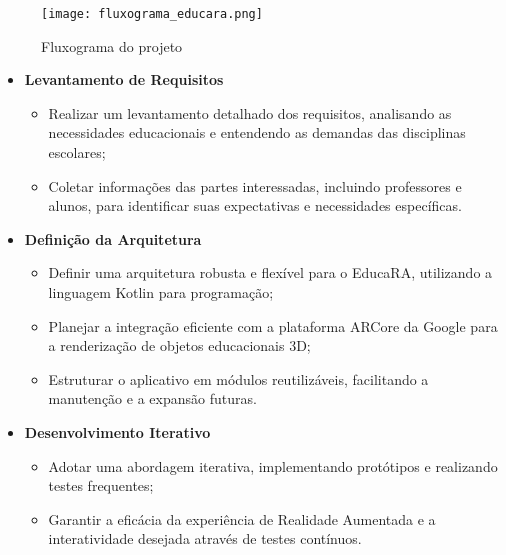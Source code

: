 \documentclass[12pt]{article}
\begin{document}
\begin{figure}[!htb]
  \centering
  \texttt{[image: fluxograma\_educara.png]}
  \caption{Fluxograma do projeto}
  \label{fig:fluxograma_educara}
\end{figure}

\begin{itemize} 
\item \textbf{Levantamento de Requisitos} 

\begin{itemize}
    \item Realizar um levantamento detalhado dos requisitos, analisando as necessidades educacionais e entendendo as demandas das disciplinas escolares;
    \item Coletar informações das partes interessadas, incluindo professores e alunos, para identificar suas expectativas e necessidades específicas.
\end{itemize}
\end{itemize}

\begin{itemize}
\item \textbf{Definição da Arquitetura}

\begin{itemize}
    \item Definir uma arquitetura robusta e flexível para o EducaRA, utilizando a linguagem Kotlin para programação;
    \item Planejar a integração eficiente com a plataforma ARCore da Google para a renderização de objetos educacionais 3D;
    \item Estruturar o aplicativo em módulos reutilizáveis, facilitando a manutenção e a expansão futuras.
\end{itemize}
\end{itemize}

\begin{itemize}
\item \textbf{Desenvolvimento Iterativo}

\begin{itemize}
    \item Adotar uma abordagem iterativa, implementando protótipos e realizando testes frequentes;
    \item Garantir a eficácia da experiência de Realidade Aumentada e a interatividade desejada através de testes contínuos.
\end{itemize}
\end{itemize}
\end{document}
